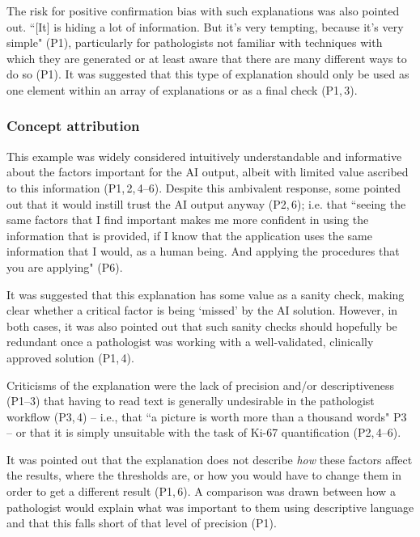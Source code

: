 \documentclass[final,5p,times,twocolumn,hyphens]{elsarticle}
\begin{document}
The risk for positive confirmation bias with such explanations was also pointed out. ``[It] is hiding a lot of information. But it's very tempting, because it's very simple" (P1), particularly for pathologists not familiar with techniques with which they are generated or at least aware that there are many different ways to do so (P1). It was suggested that this type of explanation should only be used as one element within an array of explanations or as a final check (P1,\,3).

\subsubsection{Concept attribution}

This example was widely considered intuitively understandable and informative about the factors important for the AI output, albeit with limited value ascribed to this information (P1,\,2,\,4--6). Despite this ambivalent response, some pointed out that it would instill trust the AI output anyway (P2,\,6); i.e. that ``seeing the same factors that I find important makes me more confident in using the information that is provided, if I know that the application uses the same information that I would, as a human being. And applying the procedures that you are applying" (P6). 


It was suggested that this explanation has some value as a sanity check, making clear whether a critical factor is being `missed' by the AI solution. However, in both cases, it was also pointed out that such sanity checks should hopefully be redundant once a pathologist was working with a well-validated, clinically approved solution (P1,\,4).

Criticisms of the explanation were the lack of precision and/or descriptiveness (P1--3) that having to read text is generally undesirable in the pathologist workflow (P3,\,4) -- i.e., that ``a picture is worth more than a thousand words" P3 -- or that it is simply unsuitable with the task of Ki-67 quantification (P2,\,4--6). 

It was pointed out that the explanation does not describe \textit{how} these factors affect the results, where the thresholds are, or how you would have to change them in order to get a different result (P1,\,6). A comparison was drawn between how a pathologist would explain what was important to them using descriptive language and that this falls short of that level of precision (P1).
\end{document}
